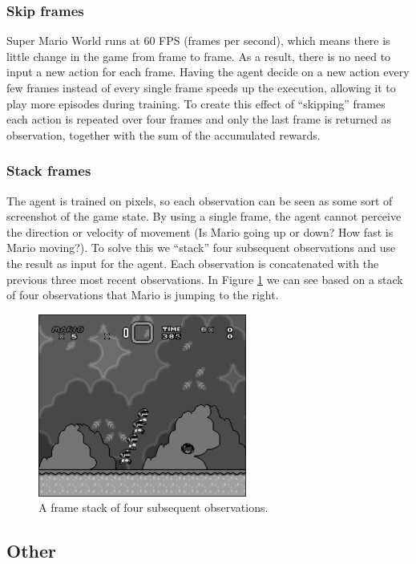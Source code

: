 \documentclass[a4paper]{article}
\begin{document}
\subsubsection{Skip frames}
Super Mario World runs at 60 FPS (frames per second), which means there is little change in the game from frame to frame.
As a result, there is no need to input a new action for each frame.
Having the agent decide on a new action every few frames instead of every single frame speeds up the execution, allowing it to play more episodes during training.
To create this effect of ``skipping'' frames each action is repeated over four frames and only the last frame is returned as observation, together with the sum of the accumulated rewards.

\subsubsection{Stack frames}
The agent is trained on pixels, so each observation can be seen as some sort of screenshot of the game state.
By using a single frame, the agent cannot perceive the direction or velocity of movement (Is Mario going up or down? How fast is Mario moving?).
To solve this we ``stack'' four subsequent observations and use the result as input for the agent.
Each observation is concatenated with the previous three most recent observations.
In Figure \ref{fig:stack} we can see based on a stack of four observations that Mario is jumping to the right.
\begin{figure}[htbp]
    \centering
    \includegraphics[height=6cm]{stacked}
    \caption{A frame stack of four subsequent observations.}
    \label{fig:stack}
\end{figure}

\subsection{Other}
\end{document}
